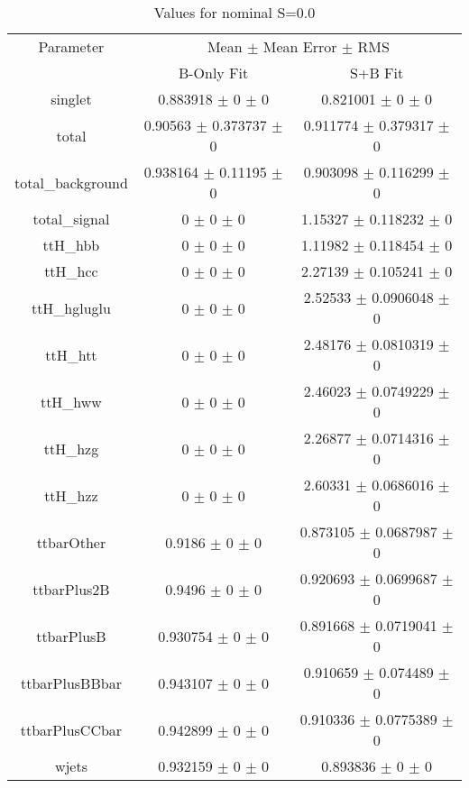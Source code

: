 \begin{table}
\centering
\caption{Values for nominal S=0.0}
\begin{tabular}{ccc}
\toprule
Parameter & \multicolumn{2}{c}{Mean $\pm$ Mean Error $\pm$ RMS}\\
 & B-Only Fit & S+B Fit\\
\midrule
singlet & \num{0.883918} $\pm$ \num{0} $\pm$ \num{0} & \num{0.821001} $\pm$ \num{0} $\pm$ \num{0}\\
total & \num{0.90563} $\pm$ \num{0.373737} $\pm$ \num{0} & \num{0.911774} $\pm$ \num{0.379317} $\pm$ \num{0}\\
total\_background & \num{0.938164} $\pm$ \num{0.11195} $\pm$ \num{0} & \num{0.903098} $\pm$ \num{0.116299} $\pm$ \num{0}\\
total\_signal & \num{0} $\pm$ \num{0} $\pm$ \num{0} & \num{1.15327} $\pm$ \num{0.118232} $\pm$ \num{0}\\
ttH\_hbb & \num{0} $\pm$ \num{0} $\pm$ \num{0} & \num{1.11982} $\pm$ \num{0.118454} $\pm$ \num{0}\\
ttH\_hcc & \num{0} $\pm$ \num{0} $\pm$ \num{0} & \num{2.27139} $\pm$ \num{0.105241} $\pm$ \num{0}\\
ttH\_hgluglu & \num{0} $\pm$ \num{0} $\pm$ \num{0} & \num{2.52533} $\pm$ \num{0.0906048} $\pm$ \num{0}\\
ttH\_htt & \num{0} $\pm$ \num{0} $\pm$ \num{0} & \num{2.48176} $\pm$ \num{0.0810319} $\pm$ \num{0}\\
ttH\_hww & \num{0} $\pm$ \num{0} $\pm$ \num{0} & \num{2.46023} $\pm$ \num{0.0749229} $\pm$ \num{0}\\
ttH\_hzg & \num{0} $\pm$ \num{0} $\pm$ \num{0} & \num{2.26877} $\pm$ \num{0.0714316} $\pm$ \num{0}\\
ttH\_hzz & \num{0} $\pm$ \num{0} $\pm$ \num{0} & \num{2.60331} $\pm$ \num{0.0686016} $\pm$ \num{0}\\
ttbarOther & \num{0.9186} $\pm$ \num{0} $\pm$ \num{0} & \num{0.873105} $\pm$ \num{0.0687987} $\pm$ \num{0}\\
ttbarPlus2B & \num{0.9496} $\pm$ \num{0} $\pm$ \num{0} & \num{0.920693} $\pm$ \num{0.0699687} $\pm$ \num{0}\\
ttbarPlusB & \num{0.930754} $\pm$ \num{0} $\pm$ \num{0} & \num{0.891668} $\pm$ \num{0.0719041} $\pm$ \num{0}\\
ttbarPlusBBbar & \num{0.943107} $\pm$ \num{0} $\pm$ \num{0} & \num{0.910659} $\pm$ \num{0.074489} $\pm$ \num{0}\\
ttbarPlusCCbar & \num{0.942899} $\pm$ \num{0} $\pm$ \num{0} & \num{0.910336} $\pm$ \num{0.0775389} $\pm$ \num{0}\\
wjets & \num{0.932159} $\pm$ \num{0} $\pm$ \num{0} & \num{0.893836} $\pm$ \num{0} $\pm$ \num{0}\\
\bottomrule
\end{tabular}
\end{table}